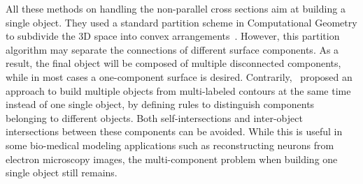 All these methods on handling the non-parallel cross sections aim at
building a single object. They used a standard partition scheme in
Computational Geometry to subdivide the 3D space into convex
arrangements~\cite{BM07}. However, this partition algorithm may
separate the connections of different surface components. As a
result, the final object will be composed of multiple disconnected
components, while in most cases a one-component surface is desired.
Contrarily,~\cite{EB11} proposed an approach to build multiple
objects from multi-labeled contours at the same time instead of one
single object, by defining rules to distinguish components belonging
to different objects. Both self-intersections and inter-object
intersections between these components can be avoided. While this is
useful in some bio-medical modeling applications such as
reconstructing neurons from electron microscopy images, the
multi-component problem when building one single object still
remains.






































